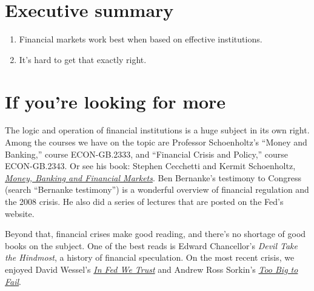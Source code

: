 \section*{Executive summary}

\begin{enumerate}
\item Financial markets work best when based on effective institutions.
\item It's hard to get that exactly right.
\end{enumerate}


\begin{comment}
\section*{Review questions}

\begin{enumerate}

\item ...
\end{enumerate}
\end{comment}

\section*{If you're looking for more}

The logic and operation of financial institutions is a huge subject
in its own right.
Among the courses we have on the topic are Professor Schoenholtz's
``Money and Banking,'' course ECON-GB.2333,
and ``Financial Crisis and Policy,'' course ECON-GB.2343.
Or see his book:
Stephen Cecchetti and Kermit Schoenholtz,
\href{http://www.amazon.com/dp/007802174X/}
{\it Money, Banking and Financial Markets\/}.
Ben Bernanke's  testimony to Congress (search ``Bernanke 
 testimony'')
is a wonderful overview of financial regulation and the 2008 crisis.
He also did a series of lectures that are posted on the Fed's website.

Beyond that, financial crises make good reading, and there's no shortage
of good books on the subject.
One of the best reads is Edward Chancellor's {\it Devil Take the Hindmost\/},
a history of financial speculation.
On the most recent crisis,
we enjoyed David Wessel's
\href{http://www.amazon.com/FED-We-Trust-Bernankes-Great/dp/0307459691/}
{\it In Fed We Trust\/}
and Andrew Ross Sorkin's
\href{http://www.amazon.com/Too-Big-Fail-Washington-FinancialSystem/dp/0143120271/}
{\it Too Big to Fail\/}.
